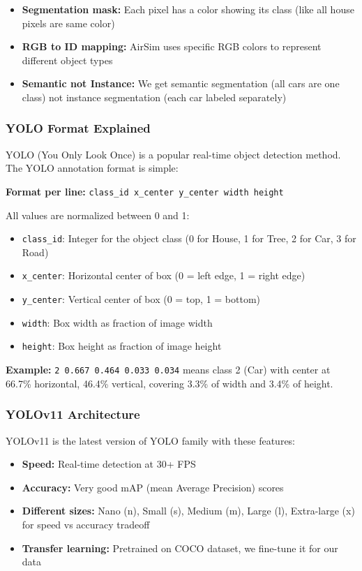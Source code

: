 \begin{itemize}
	\item \textbf{Segmentation mask:} Each pixel has a color showing its class (like all house pixels are same color)
	\item \textbf{RGB to ID mapping:} AirSim uses specific RGB colors to represent different object types
	\item \textbf{Semantic not Instance:} We get semantic segmentation (all cars are one class) not instance segmentation (each car labeled separately)
\end{itemize}

\subsubsection{YOLO Format Explained}

YOLO (You Only Look Once) is a popular real-time object detection method. The YOLO annotation format is simple:

\textbf{Format per line:} \texttt{class\_id x\_center y\_center width height}

All values are normalized between 0 and 1:
\begin{itemize}
	\item \texttt{class\_id}: Integer for the object class (0 for House, 1 for Tree, 2 for Car, 3 for Road)
	\item \texttt{x\_center}: Horizontal center of box (0 = left edge, 1 = right edge)
	\item \texttt{y\_center}: Vertical center of box (0 = top, 1 = bottom)
	\item \texttt{width}: Box width as fraction of image width
	\item \texttt{height}: Box height as fraction of image height
\end{itemize}

\textbf{Example:} \texttt{2 0.667 0.464 0.033 0.034} means class 2 (Car) with center at 66.7\% horizontal, 46.4\% vertical, covering 3.3\% of width and 3.4\% of height.

\subsubsection{YOLOv11 Architecture}

YOLOv11 is the latest version of YOLO family with these features:
\begin{itemize}
	\item \textbf{Speed:} Real-time detection at 30+ FPS
	\item \textbf{Accuracy:} Very good mAP (mean Average Precision) scores
	\item \textbf{Different sizes:} Nano (n), Small (s), Medium (m), Large (l), Extra-large (x) for speed vs accuracy tradeoff
	\item \textbf{Transfer learning:} Pretrained on COCO dataset, we fine-tune it for our data
\end{itemize}

